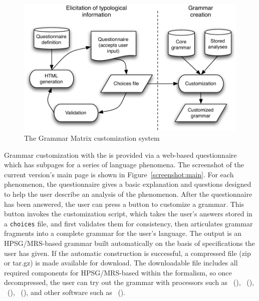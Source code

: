 \begin{figure}[!t]
\begin{center} 
\includegraphics[width=.9\textwidth]{pdf/schema.pdf}
\caption{The \lingo Grammar Matrix customization system}
\label{fig:schema}
\end{center}
\end{figure}





Grammar customization with the \lingo {} is provided
via a web-based questionnaire which has subpages for a series of
language phenomena.  The screenshot of the current version's main page
is shown in Figure~\ref{screenshot:main}.  For each phenomenon, the
questionnaire gives a basic explanation and questions designed to help
the user describe an analysis of the phenomenon.  After the
questionnaire has been answered, the user can press a button to
customize a grammar.  This button invokes the customization script,
which takes the user's answers stored in a \texttt{choices} file, and
first validates them for consistency, then articulates grammar
fragments into a complete grammar for the user's
language. The output is an HPSG/MRS-based grammar
built automatically on the basis of specifications the user has
given. If the automatic construction is successful, a compressed file
(zip or tar.gz) is made available for download. The downloadable file
includes all required components for HPSG/MRS-based  within the  formalism, so once
decompressed, the user can try out the grammar with processors such as
\isi{\lkb}~(\citealt{copestake:02}),
\isi{\pet}~(\citealt{callmeier:00}),
\isi{\agree}~(\citealt{slayden:12}),
\isi{\ace}~(), and other
 software such as \isi{\itsdb}~(\citealt{oepen:01}).


